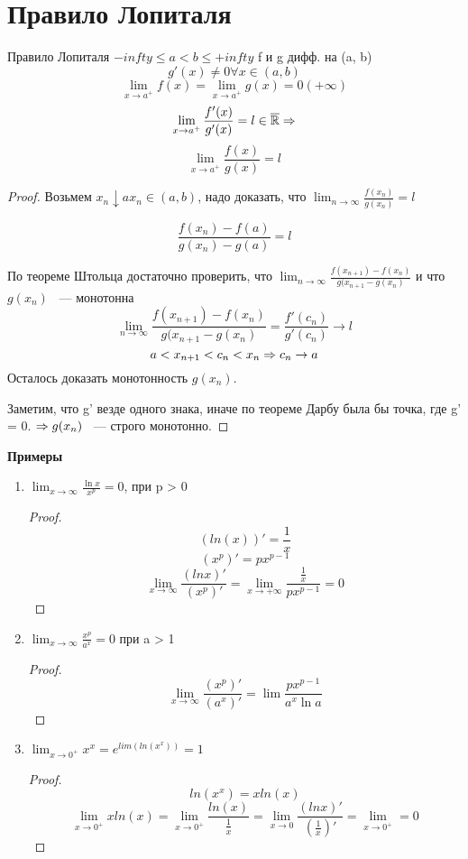 ﻿\section{Правило Лопиталя}

\begin{theorem}{Правило Лопиталя}
$-infty \le a < b \le +infty$ f и g дифф. на (a, b)
$$g'(x) \ne 0 \forall x \in (a, b)$$
$$\lim_{x \to a^+} f(x) = \lim_{x \to a^+} g(x) = 0(+ \infty)$$
$$\lim_{x \to a^{+}}\frac{f'(x)}{g'(x)} = l \in \overline{\mathbb{R}} \Rightarrow$$
$$\lim_{x \to a^{+}}\frac{f(x)}{g(x)} = l$$
\end{theorem}
\begin{proof}
    Возьмем $x_n \downarrow a x_n \in(a, b)$, надо доказать, что $\lim_{n \to \infty}\frac{f(x_n)}{g(x_n)} = l$

    $$\frac{f(x_n) - f(a)}{g(x_n) - g(a)} = l$$

    По теореме Штольца достаточно проверить, что  $\lim_{n \to \infty}\frac{f(x_{n + 1}) - f(x_n)}{g(x_{n + 1} - g(x_n)}$ и что $g(x_n)$ ~--- монотонна
    $$\lim_{n \to \infty}\frac{f(x_{n + 1}) - f(x_n)}{g(x_{n + 1} - g(x_n)} = \frac{f'(c_n)}{g'(c_n)} \to l$$
    $$a < x_{n+1} < c_n < x_n \Rightarrow c_n \to a$$
    Осталось доказать монотонность $g(x_n)$.

    Заметим, что g' везде одного знака, иначе по теореме Дарбу была бы точка, где g' = 0. $\Rightarrow g(x_n)$ ~--- строго монотонно. 
\end{proof}

{\bf Примеры}
\begin{enumerate}
    \item $\lim_{x \to \infty}\frac{\ln x}{x^p} = 0$, при p > 0
    \begin{proof}
        $$(ln(x))' = \frac1x$$
        $$(x^p)' = px^{p - 1}$$
        $$\lim_{x \to \infty}\frac{(ln x)'}{(x^p)'} = \lim_{x \to +\infty}\frac{\frac{1}{x}}{px^{p - 1}} = 0$$
    \end{proof}
    \item $\lim_{x \to \infty}\frac{x^p}{a^x} = 0$ при a > 1
    \begin{proof}
        $$\lim_{x\to \infty}\frac{(x^p)'}{(a^x)'} = \lim\frac{px^{p - 1}}{a^x \ln a}$$
    \end{proof}
    \item $\lim_{x \to 0^+}x^x = e^{lim(ln(x^x))} = 1$
    \begin{proof}
        $$ln(x^x) = x ln(x)$$
        $$\lim_{x \to 0^+} x ln(x) = \lim_{x\to 0^+}\frac{ln(x)}{\frac{1}{x}} = \lim_{x \to 0}\frac{(ln x)'}{(\frac{1}{x})'} = \lim_{x \to 0^+} = 0$$
    \end{proof}
\end{enumerate}
